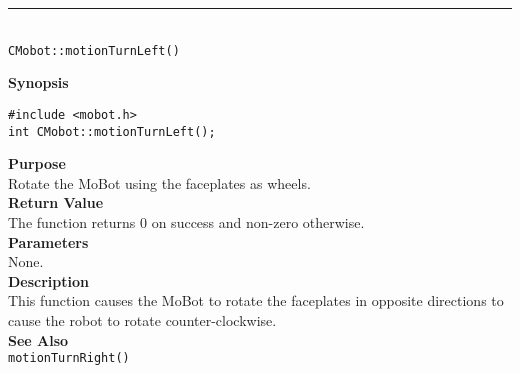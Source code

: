 \noindent
\vspace{5pt}
\rule{4.5in}{0.015in}\\
\noindent
{\LARGE \texttt{CMobot::motionTurnLeft()}}\\
{}

\noindent
{\bf Synopsis}\\
\begin{verbatim}
#include <mobot.h>
int CMobot::motionTurnLeft();
\end{verbatim}

\noindent
{\bf Purpose}\\
Rotate the MoBot using the faceplates as wheels.\\

\noindent
{\bf Return Value}\\
The function returns 0 on success and non-zero otherwise.\\

\noindent
{\bf Parameters}\\
None.\\

\noindent
{\bf Description}\\
This function causes the MoBot to rotate the faceplates in opposite directions
to cause the robot to rotate counter-clockwise.\\

\noindent
{\bf See Also}\\
\texttt{motionTurnRight()}

